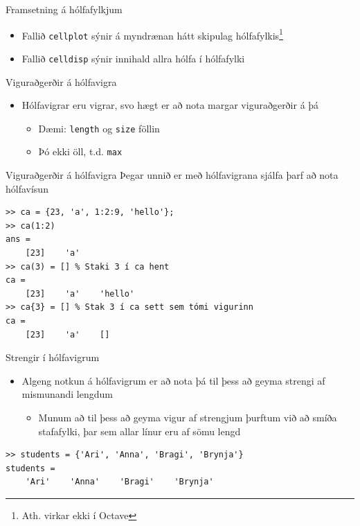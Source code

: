 \documentclass[handout]{beamer}
\begin{document}
\begin{frame}{Framsetning á hólfafylkjum}
\begin{itemize}
 \item Fallið \texttt{cellplot} sýnir á myndrænan hátt skipulag hólfafylkis\footnote{Ath. virkar ekki í Octave}
 \item Fallið \texttt{celldisp} sýnir innihald allra hólfa í hólfafylki
\end{itemize}
\end{frame}

\begin{frame}{Viguraðgerðir á hólfavigra}
\begin{itemize}
 \item Hólfavigrar eru vigrar, svo hægt er að nota margar viguraðgerðir á þá
 \begin{itemize}
  \item Dæmi: \texttt{length} og \texttt{size} föllin
  \item Þó ekki öll, t.d. \texttt{max}
 \end{itemize}
\end{itemize}
\end{frame}

\begin{frame}[fragile]{Viguraðgerðir á hólfavigra}
Þegar unnið er með hólfavigrana sjálfa þarf að nota hólfavísun
\begin{verbatim}
>> ca = {23, 'a', 1:2:9, 'hello'};
>> ca(1:2)
ans = 
    [23]    'a'
>> ca(3) = [] % Staki 3 í ca hent
ca = 
    [23]    'a'    'hello'
>> ca{3} = [] % Stak 3 í ca sett sem tómi vigurinn
ca = 
    [23]    'a'    []
\end{verbatim}
\end{frame}

\begin{frame}[fragile]{Strengir í hólfavigrum}
\begin{itemize}
 \item Algeng notkun á hólfavigrum er að nota þá til þess að geyma strengi af mismunandi lengdum
 \begin{itemize}
  \item Munum að til þess að geyma vigur af strengjum þurftum við að smíða stafafylki, þar sem allar línur eru af sömu lengd
 \end{itemize}
\end{itemize}
\begin{verbatim}
>> students = {'Ari', 'Anna', 'Bragi', 'Brynja'}
students = 
    'Ari'    'Anna'    'Bragi'    'Brynja'
\end{verbatim}
\end{frame}
\end{document}
